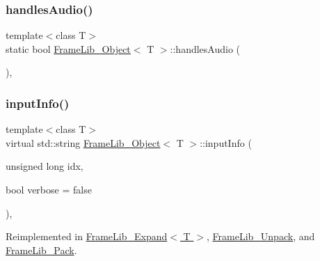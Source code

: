 \mbox{\label{class_frame_lib___object_a3d8517596d7598585c08af375dae79b9}} 
\subsubsection{\texorpdfstring{handles\+Audio()}{handlesAudio()}}
{\footnotesize\ttfamily template$<$class T$>$ \\
static bool \hyperlink{class_frame_lib___object}{Frame\+Lib\+\_\+\+Object}$<$ T $>$\+::handles\+Audio (\begin{DoxyParamCaption}{ }\end{DoxyParamCaption})\hspace{0.3cm}{\ttfamily [inline]}, {\ttfamily [static]}}

\mbox{\label{class_frame_lib___object_a49abea5f18125c425b1eae8710735891}} 
\subsubsection{\texorpdfstring{input\+Info()}{inputInfo()}}
{\footnotesize\ttfamily template$<$class T$>$ \\
virtual std\+::string \hyperlink{class_frame_lib___object}{Frame\+Lib\+\_\+\+Object}$<$ T $>$\+::input\+Info (\begin{DoxyParamCaption}\item[{unsigned long}]{idx,  }\item[{bool}]{verbose = {\ttfamily false} }\end{DoxyParamCaption})\hspace{0.3cm}{\ttfamily [inline]}, {\ttfamily [virtual]}}



Reimplemented in \hyperlink{class_frame_lib___expand_ab9017c7fe8562857609fcf819b7d1cdd}{Frame\+Lib\+\_\+\+Expand$<$ T $>$}, \hyperlink{class_frame_lib___unpack_a1ee09b9d9ab16f598f3462d9b29533be}{Frame\+Lib\+\_\+\+Unpack}, and \hyperlink{class_frame_lib___pack_ae9dacf16825332c2227cd9fd9af9db1d}{Frame\+Lib\+\_\+\+Pack}.

\mbox{\label{class_frame_lib___object_ab1ab1ae8180bb8b7e881aac6a4e1066c}} 
